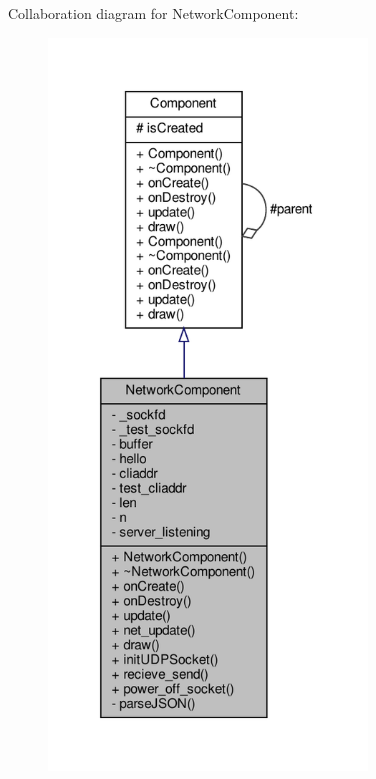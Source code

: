Collaboration diagram for Network\+Component\+:
\nopagebreak
\begin{figure}[H]
\begin{center}
\leavevmode
\includegraphics[height=550pt]{classNetworkComponent__coll__graph}
\end{center}
\end{figure}
